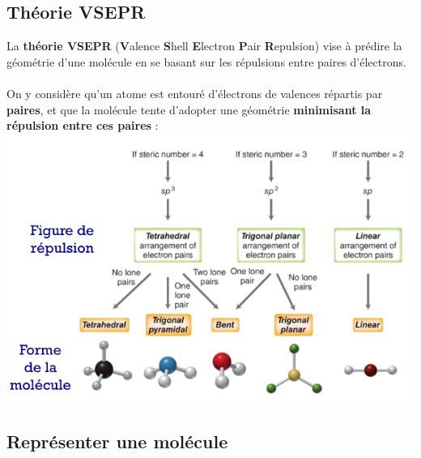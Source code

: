 \documentclass{article}
\begin{document}
    \subsection{Théorie VSEPR}
        La \textbf{théorie VSEPR} (\textbf{V}alence \textbf{S}hell \textbf{E}lectron \textbf{P}air \textbf{R}epulsion)
        vise à prédire la géométrie d'une molécule en se basant sur les
        répulsions entre paires d'électrons. \\\\
        On y considère qu'un atome est entouré d'électrons de valences répartis 
        par \textbf{paires}, et que la molécule tente d'adopter une 
        géométrie \textbf{minimisant la répulsion entre ces paires} :\\
        \includegraphics[scale=.7]{VSEPR.png}

    \subsection{Représenter une molécule}
\end{document}
